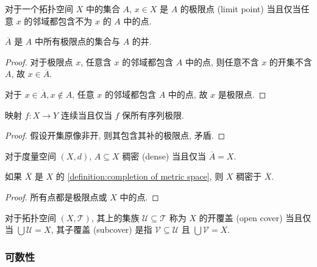 \begin{definition}[极限点]
    对于一个拓扑空间 \(X\) 中的集合 \(A\), \(x \in X\) 是 \(A\) 的极限点 (limit point) 当且仅当任意 \(x\) 的邻域都包含不为 \(x\) 的 \(A\) 中的点.
\end{definition}

\begin{lemma}
    \(\overline{A}\) 是 \(A\) 中所有极限点的集合与 \(A\) 的并.

    \begin{proof}
        对于极限点 \(x\), 任意含 \(x\) 的邻域都包含 \(A\) 中的点, 则任意不含 \(x\) 的开集不含 \(A\), 故 \(x \in \overline{A}\).

        对于 \(x \in \overline{A}, x \notin A\), 任意 \(x\) 的邻域都包含 \(A\) 中的点, 故 \(x\) 是极限点.
    \end{proof}
\end{lemma}

\begin{corollary}
    映射 \(f : X \to Y\) 连续当且仅当 \(f\) 保所有序列极限.

    \begin{proof}
        假设开集原像非开, 则其包含其补的极限点, 矛盾.
    \end{proof}
\end{corollary}

\begin{definition}[稠密]
    \label {definition:dense in topological space}
    对于度量空间 \((X,d)\), \(A \subseteq X\) 稠密 (dense) 当且仅当 \(\overline{A} = X\).
\end{definition}

\begin{example}
    如果 \(\overline{X}\) 是 \(X\) 的 \ref{definition:completion of metric space}, 则 \(X\) 稠密于 \(\overline{X}\).

    \begin{proof}
        所有点都是极限点或 \(X\) 中的点.
    \end{proof}
\end{example}

\begin{definition}[开覆盖]
    对于拓扑空间 \((X,\mathcal{T})\), 其上的集族 \(\mathcal{U} \subseteq \mathcal{T}\) 称为 \(X\) 的开覆盖 (open cover) 当且仅当 \(\bigcup \mathcal{U} = X\),
    其子覆盖 (subcover) 是指 \(\mathcal{V} \subseteq \mathcal{U}\) 且 \(\bigcup \mathcal{V} = X\).
\end{definition}

\subsubsection{可数性}

